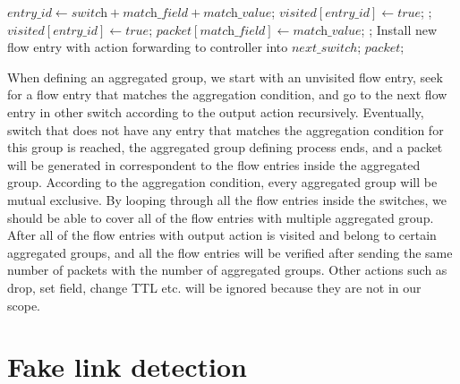 \begin {tcolorbox}[blanker,float=tbp,
grow to left by=1cm, grow to right by=1cm]
\begin{algorithm}[H]
  \begin{algorithmic}[1]
        \State $\textit{entry\_id} \gets \textit{switch} + \textit{match\_field} + \textit{match\_value}$;
            \State $\textit{visited}[\textit{entry\_id}] \gets true$;
            \State \Return {};
            \State $\textit{visited}[\textit{entry\_id}] \gets true$;
            \State $\textit{packet}[\textit{match\_field}] \gets \textit{match\_value}$;
            \State \Return {};
          \EndIf
        \EndIf
      \EndFor
      \State Install new flow entry with action forwarding to controller into $next\_switch$;
      \State \Return $packet$;
    \EndFunction
  \end{algorithmic}
\end{algorithm}
\end{tcolorbox}

When defining an aggregated group, we start with an unvisited flow entry, seek for a flow entry that matches the aggregation condition, and go to the next flow entry in other switch according to the output action recursively. Eventually, switch that does not have any entry that matches the aggregation condition for this group is reached, the aggregated group defining process ends, and a packet will be generated in correspondent to the flow entries inside the aggregated group. According to the aggregation condition, every aggregated group will be mutual exclusive. By looping through all the flow entries inside the switches, we should be able to cover all of the flow entries with multiple aggregated group. After all of the flow entries with output action is visited and belong to certain aggregated groups, and all the flow entries will be verified after sending the same number of packets with the number of aggregated groups. Other actions such as drop, set field, change TTL etc. will be ignored because they are not in our scope. 

\section{Fake link detection}

